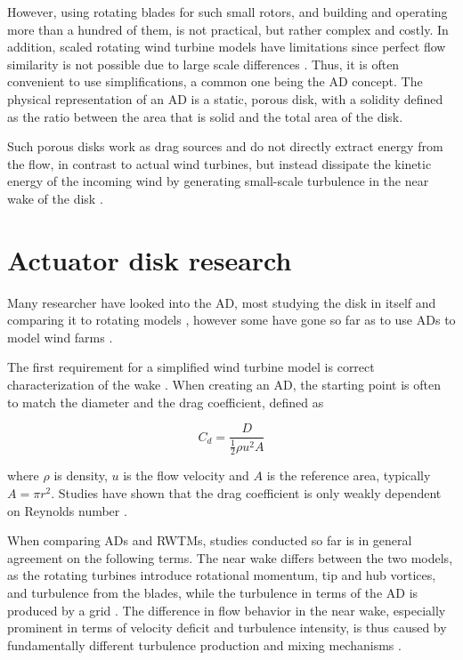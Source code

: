 However, using rotating blades for such small rotors, and building and operating more than a hundred of them, is not practical, but rather complex and costly. In addition, scaled rotating wind turbine models have limitations since perfect flow similarity is not possible due to large scale differences \cite{Bossuyt2016}. Thus, it is often convenient to use simplifications, a common one being the \gls{AD} concept. The physical representation of an \gls{AD} is a static, porous disk, with a solidity defined as the ratio between the area that is solid and the total area of the disk. 


Such porous disks work as drag sources and do not directly extract energy from the flow, in contrast to actual wind turbines, but instead dissipate the kinetic energy of the incoming wind by generating small-scale turbulence in the near wake of the disk \cite{Lignarolo2016}. 


\section{Actuator disk research}

Many researcher have looked into the \gls{AD}, most studying the disk in itself and comparing it to rotating models \cite{Neunaber} \cite{Aubrun2019} \cite{Sforza1981}  \cite{Lignarolo2014} \cite{Blackmore2013} \cite{Pierella2010}  \cite{Cannon1993}   \cite{Aubrun2013}, however some have gone so far as to use \gls{AD}s to model wind farms \cite{Bossuyt2016} \cite{Theunissen2014} \cite{Theunissen2019}. 

The first requirement for a simplified wind turbine model is correct characterization of the wake \cite{Theunissen2014}. When creating an \gls{AD}, the starting point is often to match the diameter and the drag coefficient, defined as

\begin{equation}
    C_d = \frac{D}{\frac{1}{2} \rho u^2 A}
    \label{Eq:Cd}
\end{equation}

where $\rho$ is density, $u$ is the flow velocity and $A$ is the reference area, typically $A = \pi r^2$. Studies have shown that the drag coefficient is only weakly dependent on Reynolds number \cite{Blackmore2013}. 

When comparing \gls{AD}s and \gls{RWTM}s, studies conducted so far is in general agreement on the following terms. The near wake differs between the two models, as the rotating turbines introduce rotational momentum, tip and hub vortices, and turbulence from the blades, while the turbulence in terms of the \gls{AD} is produced by a grid \cite{Lignarolo2014} \cite{Zhang2012}  \cite{Barthelmie2009}. The difference in flow behavior in the near wake, especially prominent in terms of velocity deficit and turbulence intensity, is thus caused by fundamentally different turbulence production and mixing mechanisms \cite{Aubrun2019} \cite{Lignarolo2016} \cite{Barthelmie2010}.

